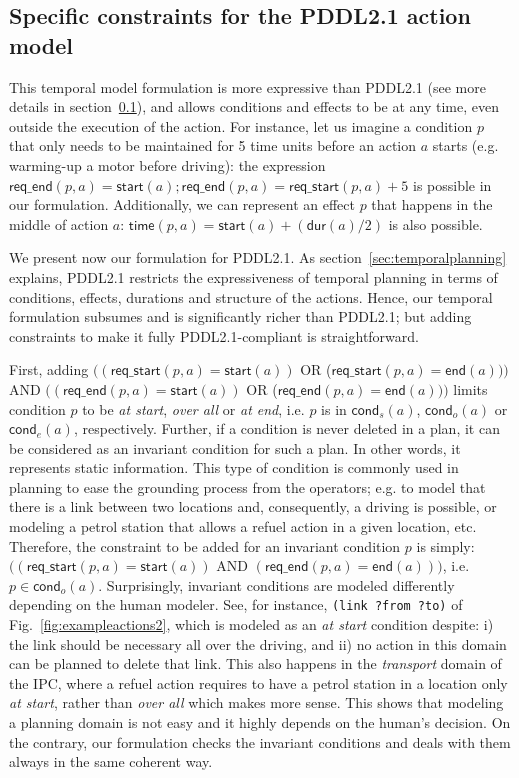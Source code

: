 \documentclass{ecai}
\newcommand{\cond}{\mathsf{cond}}  %
\newcommand{\dur}{\mathsf{dur}}    %
\newcommand{\start}{\mathsf{start}}%
\newcommand{\en}{\mathsf{end}}     %
\newcommand{\tim}{\mathsf{time}}   %
\newcommand{\reqs}{\mathsf{req\_{start}}} %
\newcommand{\reqe}{\mathsf{req\_{end}}}   %
\begin{document}
\subsection{Specific constraints for the PDDL2.1 action model}
\label{sec:PDDL21constraints}
This temporal model formulation is more expressive than PDDL2.1 (see more details in section~\ref{sec:PDDL21constraints}), and allows conditions and effects to be at any time, even outside the execution of the action. For instance, let us imagine a condition $p$ that only needs to be maintained for 5 time units before an action $a$ starts (e.g. warming-up a motor before driving): the expression $\reqe(p,a)=\start(a); \reqe(p,a) = \reqs(p,a)+5$ is possible in our formulation. Additionally, we can represent an effect $p$ that happens in the middle of action $a$: $\tim(p,a) = \start(a)+ (\dur(a) / 2)$ is also possible.

We present now our formulation for PDDL2.1. As section~\ref{sec:temporalplanning} explains, PDDL2.1 restricts the expressiveness of temporal planning in terms of conditions, effects, durations and structure of the actions. Hence, our temporal formulation subsumes and is significantly richer than PDDL2.1; but adding constraints to make it fully PDDL2.1-compliant is straightforward.

First, adding $((\reqs(p,a) = \start(a))$ OR ($\reqs(p,a) = \en(a)))$ AND $((\reqe(p,a) = \start(a))$ OR ($\reqe(p,a) = \en(a)))$ limits condition $p$ to be \emph{at start}, \emph{over all} or \emph{at end}, i.e. $p$ is in $\cond_s(a)$, $\cond_o(a)$ or $\cond_e(a)$, respectively.
Further, if a condition is never deleted in a plan, it can be considered as an invariant condition for such a plan. In other words, it represents static information. This type of condition is commonly used in planning to ease the grounding process from the operators; e.g. to model that there is a link between two locations and, consequently, a driving is possible, or modeling a petrol station that allows a refuel action in a given location, etc. Therefore, the constraint to be added for an invariant condition $p$ is simply: $((\reqs(p,a) = \start(a))$ AND $(\reqe(p,a) = \en(a)))$, i.e. $p \in \cond_o(a)$.
Surprisingly, invariant conditions are modeled differently depending on the human modeler. See, for instance, \texttt{(link ?from ?to)} of Fig.~\ref{fig:exampleactions2}, which is modeled as an \emph{at start} condition despite: i) the link should be necessary all over the driving, and ii) no action in this domain can be planned to delete that link.
This also happens in the \emph{transport} domain of the IPC, where a refuel action requires to have a petrol station in a location only \emph{at start}, rather than \emph{over all} which makes more sense. This shows that modeling a planning domain is not easy and it highly depends on the human's decision. On the contrary, our formulation checks the invariant conditions and deals with them always in the same coherent way.
\end{document}
